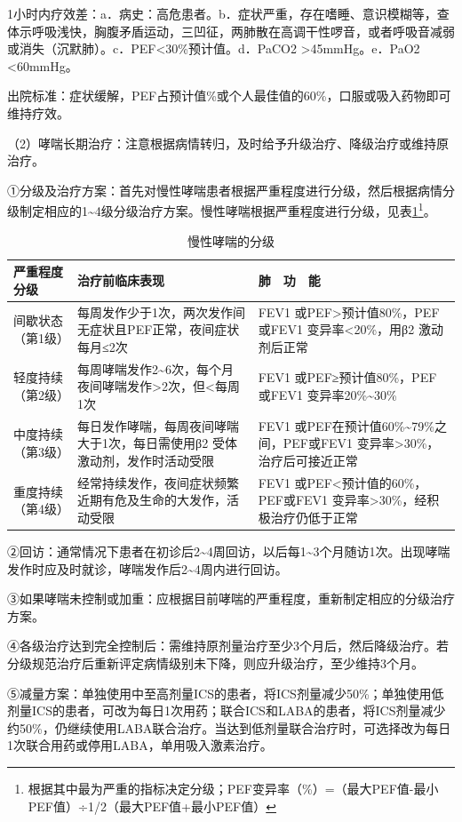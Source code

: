 1小时内疗效差：a．病史：高危患者。b．症状严重，存在嗜睡、意识模糊等，查体示呼吸浅快，胸腹矛盾运动，三凹征，两肺散在高调干性啰音，或者呼吸音减弱或消失（沉默肺）。c．PEF\textless{}30\%预计值。d．PaCO{2}
\textgreater{}45mmHg。e．PaO{2} \textless{}60mmHg。

出院标准：症状缓解，PEF占预计值\%或个人最佳值的60\%，口服或吸入药物即可维持疗效。

（2）哮喘长期治疗：注意根据病情转归，及时给予升级治疗、降级治疗或维持原治疗。

①分级及治疗方案：首先对慢性哮喘患者根据严重程度进行分级，然后根据病情分级制定相应的1\textasciitilde{}4级分级治疗方案。慢性哮喘根据严重程度进行分级，见表\ref{tab1-6-3}\footnote{根据其中最为严重的指标决定分级；PEF变异率（\%）=（最大PEF值-最小PEF值）÷1/2（最大PEF值+最小PEF值）}。

\begin{longtable}[]{lp{5cm}p{5cm}}
  \caption{慢性哮喘的分级}
  \label{tab1-6-3}\\
\toprule
严重程度分级 & 治疗前临床表现 & 肺　功　能\tabularnewline
\midrule
\endhead
间歇状态（第1级） &
每周发作少于1次，两次发作间无症状且PEF正常，夜间症状每月≤2次 & FEV{1}
或PEF\textgreater{}预计值80\%，PEF或FEV{1} 变异率\textless{}20\%，用β{2}
激动剂后正常\tabularnewline
轻度持续（第2级） &
每周哮喘发作2\textasciitilde{}6次，每个月夜间哮喘发作\textgreater{}2次，但\textless{}每周1次
& FEV{1} 或PEF≥预计值80\%，PEF或FEV{1}
变异率20\%\textasciitilde{}30\%\tabularnewline
中度持续（第3级） & 每日发作哮喘，每周夜间哮喘大于1次，每日需使用β{2}
受体激动剂，发作时活动受限 & FEV{1}
或PEF在预计值60\%\textasciitilde{}79\%之间，PEF或FEV{1}
变异率\textgreater{}30\%，治疗后可接近正常\tabularnewline
重度持续（第4级） &
经常持续发作，夜间症状频繁近期有危及生命的大发作，活动受限 & FEV{1}
或PEF\textless{}预计值的60\%，PEF或FEV{1}
变异率\textgreater{}30\%，经积极治疗仍低于正常\tabularnewline
\bottomrule
\end{longtable}


②回访：通常情况下患者在初诊后2\textasciitilde{}4周回访，以后每1\textasciitilde{}3个月随访1次。出现哮喘发作时应及时就诊，哮喘发作后2\textasciitilde{}4周内进行回访。

③如果哮喘未控制或加重：应根据目前哮喘的严重程度，重新制定相应的分级治疗方案。

④各级治疗达到完全控制后：需维持原剂量治疗至少3个月后，然后降级治疗。若分级规范治疗后重新评定病情级别未下降，则应升级治疗，至少维持3个月。

⑤减量方案：单独使用中至高剂量ICS的患者，将ICS剂量减少50\%；单独使用低剂量ICS的患者，可改为每日1次用药；联合ICS和LABA的患者，将ICS剂量减少约50\%，仍继续使用LABA联合治疗。当达到低剂量联合治疗时，可选择改为每日1次联合用药或停用LABA，单用吸入激素治疗。

